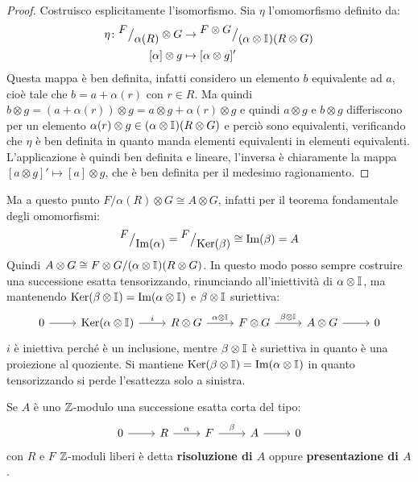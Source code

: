 \begin{proof}
  Costruisco esplicitamente l'isomorfismo. Sia $ \eta $ l'omomorfismo definito da:
  \begin{align*}
    \eta \colon {^{\textstyle F}\big/_{\textstyle \alpha(R)}} \otimes G & \to {^{\textstyle F \otimes G}\big/_{\textstyle (\alpha \otimes \mathbb{I}_{})(R \otimes G)}} \\
    [\alpha] \otimes g & \mapsto [\alpha \otimes g]'
  \end{align*}
  Questa mappa è ben definita, infatti considero un elemento $ b $ equivalente
  ad $ a $, cioè tale che $ b = a + \alpha(r) $ con $ r \in R $. Ma quindi
  $ b \otimes g = (a + \alpha(r)) \otimes g = a \otimes g + \alpha(r) \otimes g $ e quindi
  $ a \otimes g $ e $ b \otimes g $ differiscono per un elemento
  $ \alpha(r) \otimes g \in (\alpha \otimes \mathbb{I}_{})(R \otimes G) $ e perciò sono equivalenti, verificando che
  $ \eta $ è ben definita in quanto manda elementi equivalenti in elementi
  equivalenti. L'applicazione è quindi ben definita e lineare, l'inversa è
  chiaramente la mappa $ [a \otimes g]' \mapsto [a] \otimes g $, che è ben definita per il
  medesimo ragionamento.
\end{proof}
\eproof
Ma a questo punto $ {F} \slash {\alpha(R)} \otimes G \cong A \otimes G $, infatti per il teorema fondamentale
degli omomorfismi:
\[
  {^{\textstyle F}\big/_{\textstyle \mathrm{Im}( \alpha )}} = {^{\textstyle F}\big/_{\textstyle \mathrm{Ker}( \beta)}} \cong \mathrm{Im}( \beta ) = A
\]
Quindi
$ A \otimes G \cong {F \otimes G} \slash {{(\alpha \otimes \mathbb{I}_{})(R \otimes G)}} $. In questo modo posso sempre
costruire una successione esatta tensorizzando, rinunciando all'iniettività di
$ \alpha \otimes \mathbb{I}_{} $, ma mantenendo
$ \mathrm{Ker}( \beta \otimes \mathbb{I}_{}) = \mathrm{Im}( \alpha \otimes \mathbb{I}_{} ) $ e $ \beta \otimes \mathbb{I}_{} $ suriettiva:
\[
  \begin{tikzcd}
    0 \rar & \ker{\alpha \otimes \Id{}} \rar{i} & R \otimes G \rar{\alpha \otimes \Id{}} & F \otimes G \rar{\beta \otimes \Id{}} & A \otimes G \rar & 0
  \end{tikzcd}
\]
$ i $ è iniettiva perché è un inclusione, mentre $ \beta \otimes \mathbb{I}_{} $ è suriettiva
in quanto è una proiezione al quoziente. Si mantiene $ \mathrm{Ker}( \beta \otimes \mathbb{I}_{}) = \mathrm{Im}( \alpha \otimes \mathbb{I}_{} ) $
in quanto tensorizzando si perde l'esattezza solo a sinistra.

\begin{definition}
  Se $ A $ è uno $ \mathbb{Z} $-modulo una successione esatta corta del tipo:
  \[
    \begin{tikzcd}
      0 \rar & R \rar{\alpha} & F \rar{\beta} & A \rar & 0
    \end{tikzcd}
  \]
  con $ R $ e $ F $ $ \mathbb{Z} $-moduli liberi è detta \textbf{risoluzione di
    $ A $} oppure \textbf{presentazione di
    $ A $}.
\end{definition}

